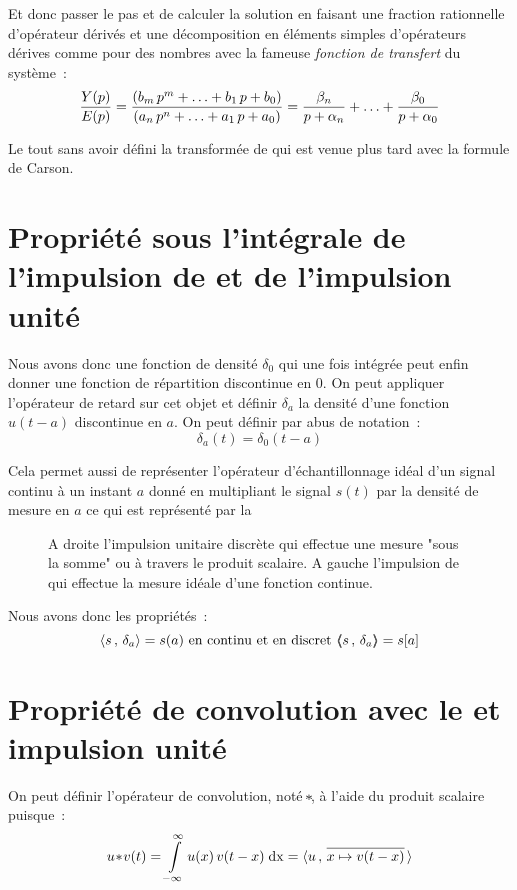 Et donc passer le pas et de calculer la solution en faisant une
fraction rationnelle d'opérateur dérivés et une décomposition en
éléments simples d'opérateurs dérives comme pour des nombres avec la fameuse \emph{fonction de transfert} du système~:
$$
\frac{Y\!\left(p\right)}{E\!\left(p\right)} = \frac{\left(b_m\,p^m + \ldots +b_1\, p + b_0\right)}{\left(a_n\,p^n + \ldots +a_1\, p + a_0\right)}=
\frac{\beta_n}{p + \alpha_n} + \ldots + \frac{\beta_0}{p +
  \alpha_0}
$$

Le tout sans avoir défini la transformée de \Laplace{} qui est venue
plus tard avec la formule de Carson.


\section{Propriété sous l'intégrale de l'impulsion de \Dirac{} et de l'impulsion unité}
\label{sec:dirac_sous_integrale}
Nous avons donc une fonction de densité $\delta_0$ qui une fois
intégrée peut enfin donner une fonction de répartition discontinue en
$0$. On peut appliquer l'opérateur de retard sur cet objet et définir
$\delta_a$ la densité d'une fonction $u(t-a)$ discontinue en $a$. On peut définir par abus de notation~:
$$
\delta_a(t)= \delta_0(t-a)
$$

Cela permet aussi de représenter l'opérateur d'échantillonnage idéal d'un signal continu à un instant $a$ donné en multipliant le signal $s(t)$ par la densité de mesure en $a$ ce qui est représenté par la~
\begin{figure}[ht!]
  \centering
  \caption{A droite l'impulsion unitaire discrète qui effectue une mesure "sous la somme" ou à travers le produit scalaire. A gauche l'impulsion de \Dirac{} qui effectue la mesure idéale d'une fonction continue.}
  \label{fig:delta_mesure}
\end{figure}

Nous avons donc les propriétés~:
$$
\langle s\,,\,\delta_a\rangle=s(a) \text{ en continu et en discret } \langle\!\!\langle s\,,\,\delta_a\rangle\!\!\rangle=s[a] 
$$

\section{Propriété de convolution avec le \Dirac{} et impulsion unité}

On peut définir l'opérateur de convolution, noté $\!\ast\!$, à l'aide du produit scalaire puisque~:
\begin{equation}
  \label{eq:convolution}
  u\!\ast\! v(t) = \int\limits_{-\infty}^{\infty}{u(x)\,v(t-x)\;\mathrm{d{x}}} = \langle u\,,\,\overline{x\mapsto v(t-x)}\,\rangle
\end{equation}


